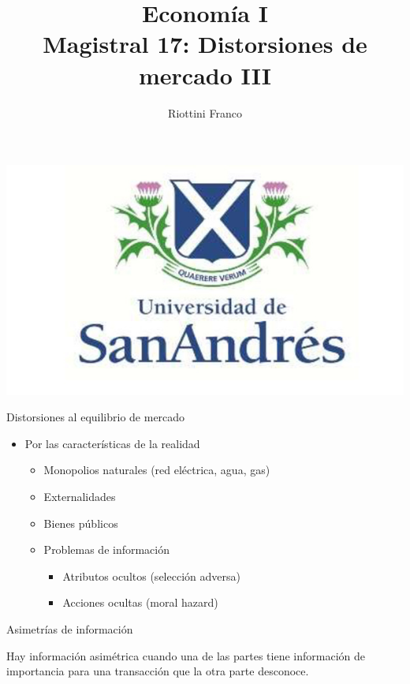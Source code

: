 \documentclass{beamer}
\title[Economía I]{Economía I \vspace{4mm}
\\ Magistral 17: Distorsiones de mercado III}
\date{}
\author[Riottini]{Riottini Franco}
\institute[]{Universidad de San Andrés}
\begin{document}
\begin{frame}
\titlepage
\centering
\includegraphics[scale=0.2]{../Figures/logoUDESA.jpg} 
\end{frame}

\begin{frame}{Distorsiones al equilibrio de mercado}
    \begin{itemize}
        \item Por las características de la realidad \vspace{1mm}
        \begin{itemize}
            \item Monopolios naturales (red eléctrica, agua, gas)   
             \vspace{1mm}
            \item Externalidades
             \vspace{1mm}
            \item Bienes públicos
            \vspace{1mm}
            \item Problemas de información
            \begin{itemize}
                \item Atributos ocultos (selección adversa)
                 \vspace{1mm}
                \item Acciones ocultas (moral hazard)
            \end{itemize}        
        \end{itemize}
    \end{itemize}
\end{frame}

\begin{frame}{Asimetrías de información}
    \begin{boxA}
        \centering
        Hay información asimétrica
        cuando una de las partes tiene información de importancia para una
        transacción que la otra parte desconoce.
    \end{boxA}
\end{frame}
\end{document}
